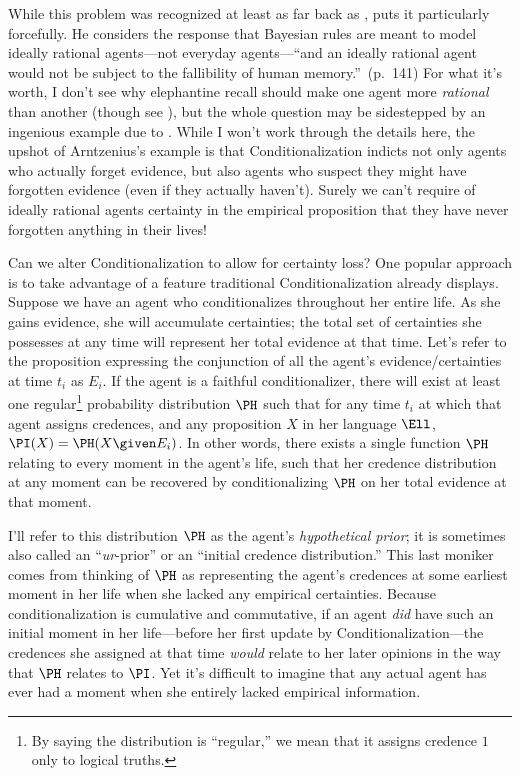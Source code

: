 While this problem was recognized at least as far back as \citet{LeviDemons}, \citet{TalbottTwoPrinciples} puts it particularly forcefully. He considers the response that Bayesian rules are meant to model ideally rational agents---not everyday agents---``and an ideally rational agent would not be subject to the fallibility of human memory.''\ (p.\ 141) For what it's worth, I don't see why elephantine recall should make one agent more \emph{rational} than another (though see \citealp{CarrDontStop}), but the whole question may be sidestepped by an ingenious example due to \citet{ArntzeniusProblems}. While I won't work through the details here, the upshot of Arntzenius's example is that Conditionalization indicts not only agents who actually forget evidence, but also agents who suspect they might have forgotten evidence (even if they actually haven't). Surely we can't require of ideally rational agents certainty in the empirical proposition that they have never forgotten anything in their lives!

Can we alter Conditionalization to allow for certainty loss? One popular approach is to take advantage of a feature traditional Conditionalization already displays. Suppose we have an agent who conditionalizes throughout her entire life. As she gains evidence, she will accumulate certainties; the total set of certainties she possesses at any time will represent her total evidence at that time. Let's refer to the proposition expressing the conjunction of all the agent's evidence/certainties at time $t_i$ as $E_i$. If the agent is a faithful conditionalizer, there will exist at least one regular\footnote
{By saying the distribution is ``regular,'' we mean that it assigns credence $1$ only to logical truths.} probability distribution $\PH$ such that for any time $t_i$ at which that agent assigns credences, and any proposition $X$ in her language $\Ell$, $\PI(X)=\PH(X \given E_i)$. In other words, there exists a single function $\PH$ relating to every moment in the agent's life, such that her credence distribution at any moment can be recovered by conditionalizing $\PH$ on her total evidence at that moment.

I'll refer to this distribution $\PH$ as the agent's \textit{hypothetical prior}; it is sometimes also called an ``\emph{ur}-prior'' or an ``initial credence distribution.'' This last moniker comes from thinking of $\PH$ as representing the agent's credences at some earliest moment in her life when she lacked any empirical certainties. Because conditionalization is cumulative and commutative, if an agent \emph{did} have such an initial moment in her life---before her first update by Conditionalization---the credences she assigned at that time \emph{would} relate to her later opinions in the way that $\PH$ relates to $\PI$. Yet it's difficult to imagine that any actual agent has ever had a moment when she entirely lacked empirical information.

